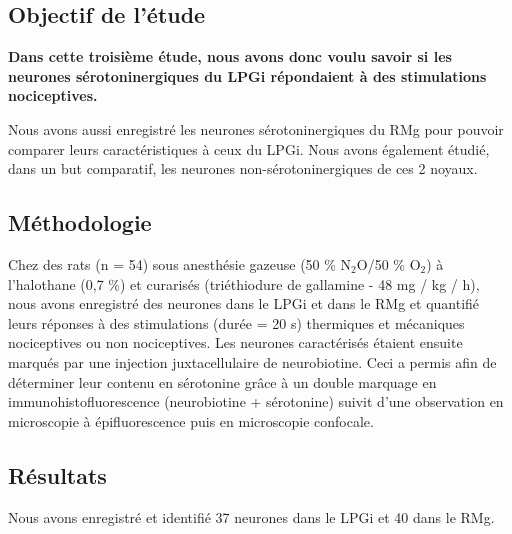 \documentclass[a4paper,12pt,twoside]{report}
\begin{document}
\subsection{Objectif de l’étude}

\textbf{Dans cette troisième étude, nous avons donc voulu savoir si les neurones sérotoninergiques du LPGi répondaient à des stimulations nociceptives.}

Nous avons aussi enregistré les neurones sérotoninergiques du RMg pour pouvoir comparer leurs caractéristiques à ceux du LPGi. Nous avons également étudié, dans un but comparatif, les neurones non-sérotoninergiques de ces 2 noyaux.

\subsection{Méthodologie}

Chez des rats (n = 54) sous anesthésie gazeuse (50 \% N$_{2}$O/50 \% O$_{2}$) à l’halothane (0,7 \%) et curarisés (triéthiodure de gallamine - 48 mg / kg / h), nous avons enregistré des neurones dans le LPGi et dans le RMg et quantifié leurs réponses à des stimulations (durée = 20 s) thermiques et mécaniques nociceptives ou non nociceptives. 
Les neurones caractérisés étaient ensuite marqués par une injection juxtacellulaire de neurobiotine. Ceci a permis afin de déterminer leur contenu en sérotonine grâce à un double marquage en immunohistofluorescence (neurobiotine + sérotonine) suivit d’une observation en microscopie à épifluorescence puis en microscopie confocale.

\subsection{Résultats}

Nous avons enregistré et identifié 37 neurones dans le LPGi et 40 dans le RMg. 
\end{document}
